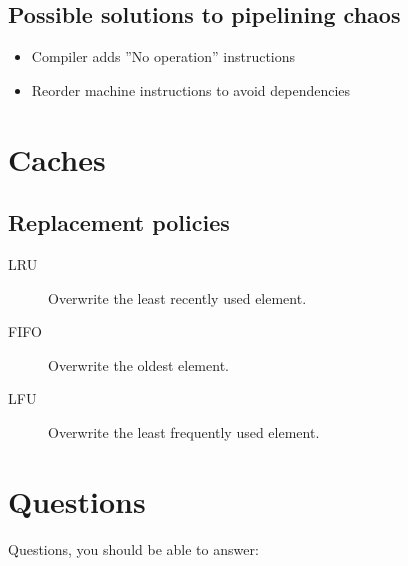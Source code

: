 \documentclass[a4paper,twocolumn]{article}
\begin{document}
\subsection{Possible solutions to pipelining chaos}

\begin{itemize}
  \item Compiler adds ''No operation'' instructions
  \item Reorder machine instructions to avoid dependencies
\end{itemize}

\section{Caches}

\subsection{Replacement policies}

\begin{description}
  \item[LRU] Overwrite the least recently used element.
  \item[FIFO] Overwrite the oldest element.
  \item[LFU] Overwrite the least frequently used element.
\end{description}

\section{Questions}

Questions, you should be able to answer:
\end{document}

